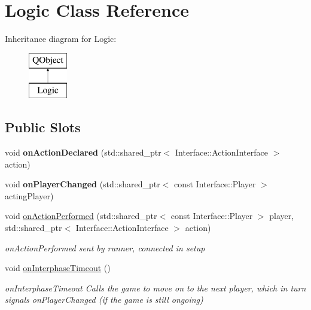 \hypertarget{class_logic}{\section{Logic Class Reference}
\label{class_logic}
}
Inheritance diagram for Logic\-:\begin{figure}[H]
\begin{center}
\leavevmode
\includegraphics[height=2.000000cm]{class_logic}
\end{center}
\end{figure}
\subsection*{Public Slots}
\begin{DoxyCompactItemize}
\item 
\hypertarget{class_logic_ad5c6773e8383ec792eec4195ba281f49}{void {\bfseries on\-Action\-Declared} (std\-::shared\-\_\-ptr$<$ Interface\-::\-Action\-Interface $>$ action)}\label{class_logic_ad5c6773e8383ec792eec4195ba281f49}

\item 
\hypertarget{class_logic_aee80f41550e3f6901e8fe3771d46d0be}{void {\bfseries on\-Player\-Changed} (std\-::shared\-\_\-ptr$<$ const Interface\-::\-Player $>$ acting\-Player)}\label{class_logic_aee80f41550e3f6901e8fe3771d46d0be}

\item 
void \hyperlink{class_logic_a8a95c59a2d66e5045921a233f0c944ac}{on\-Action\-Performed} (std\-::shared\-\_\-ptr$<$ const Interface\-::\-Player $>$ player, std\-::shared\-\_\-ptr$<$ Interface\-::\-Action\-Interface $>$ action)
\begin{DoxyCompactList}\small\item\em on\-Action\-Performed sent by runner, connected in setup \end{DoxyCompactList}\item 
\hypertarget{class_logic_af3143d6c45439366d3137282aea7ffcc}{void \hyperlink{class_logic_af3143d6c45439366d3137282aea7ffcc}{on\-Interphase\-Timeout} ()}\label{class_logic_af3143d6c45439366d3137282aea7ffcc}

\begin{DoxyCompactList}\small\item\em on\-Interphase\-Timeout Calls the game to move on to the next player, which in turn signals on\-Player\-Changed (if the game is still ongoing) \end{DoxyCompactList}\end{DoxyCompactItemize}
